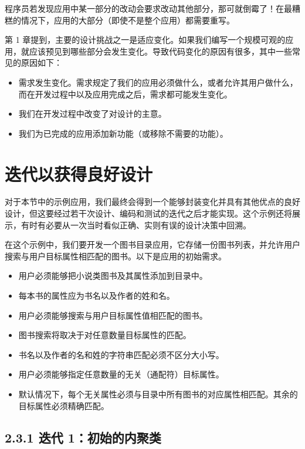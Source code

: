 程序员若发现应用中某一部分的改动会要求改动其他部分，那可就倒霉了！在最糟糕的情况下，应用的大部分（即使不是整个应用）都需要重写。

第 1 章提到，主要的设计挑战之一是适应变化。如果我们编写一个规模可观的应用，就应该预见到哪些部分会发生变化。导致代码变化的原因有很多，其中一些常见的原因如下：

\begin{itemize}
\item 需求发生变化。需求规定了我们的应用必须做什么，或者允许其用户做什么，而在开发过程中以及应用完成之后，需求都可能发生变化。
\item 我们在开发过程中改变了对设计的主意。
\item 我们为已完成的应用添加新功能（或移除不需要的功能）。
\end{itemize}

\section{迭代以获得良好设计}

对于本节中的示例应用，我们最终会得到一个能够封装变化并具有其他优点的良好设计，但这要经过若干次设计、编码和测试的迭代之后才能实现。这个示例还将展示，有时有必要从一次当时看似正确、实则有误的设计决策中回溯。

在这个示例中，我们要开发一个图书目录应用，它存储一份图书列表，并允许用户搜索与用户目标属性相匹配的图书。以下是应用的初始需求。

\begin{itemize}
\item 用户必须能够把小说类图书及其属性添加到目录中。
\item 每本书的属性应为书名以及作者的姓和名。
\item 用户必须能够搜索与用户目标属性值相匹配的图书。
\item 图书搜索将取决于对任意数量目标属性的匹配。
\item 书名以及作者的名和姓的字符串匹配必须不区分大小写。
\item 用户必须能够指定任意数量的无关（通配符）目标属性。
\item 默认情况下，每个无关属性必须与目录中所有图书的对应属性相匹配。其余的目标属性必须精确匹配。
\end{itemize}


\subsection{2.3.1 迭代 1：初始的内聚类}

